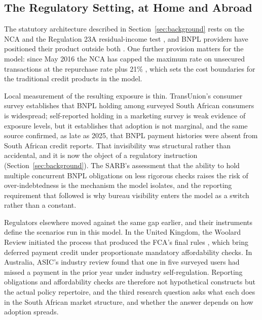 \subsection{The Regulatory Setting, at Home and Abroad}
\label{sec:lit-regulatory}

The statutory architecture described in Section~\ref{sec:background} rests on the \ac{NCA}
\cite{sa_nca_2005} and the Regulation 23A residual-income test \cite{sa_ncr_affordability_2015},
and \ac{BNPL} providers have positioned their product outside both \cite{nortonrose_bnpl_sa}. One
further provision matters for the model: since May 2016 the \ac{NCA} has capped the maximum rate
on unsecured transactions at the repurchase rate plus 21\% \cite{sa_ncr_ratecaps_2016}, which
sets the cost boundaries for the traditional credit products in the model.

Local measurement of the resulting exposure is thin. TransUnion's consumer survey
\cite{transunion_cps_sa_2025} establishes that \ac{BNPL} holding among surveyed South African
consumers is widespread; self-reported holding in a marketing survey is weak evidence of exposure
levels, but it establishes that adoption is not marginal, and the same source confirmed, as late as
2025, that \ac{BNPL} payment histories were absent from South African credit reports. That
invisibility was structural rather than accidental, and it is now the object of a regulatory
instruction (Section~\ref{sec:background}). The \ac{SARB}'s assessment that the ability to hold
multiple concurrent \ac{BNPL} obligations on less rigorous checks raises the risk of
over-indebtedness \cite{sarb_fsr_2026_1} is the mechanism the model isolates, and the reporting
requirement that followed is why bureau visibility enters the model as a switch rather than a
constant.

Regulators elsewhere moved against the same gap earlier, and their instruments define the
scenarios run in this model. In the United Kingdom, the Woolard Review \cite{woolard2021}
initiated the process that produced the \ac{FCA}'s final rules \cite{fca_ps26_1}, which bring
deferred payment credit under proportionate mandatory affordability checks. In Australia,
\ac{ASIC}'s industry review \cite{asic2020rep672} found that one in five surveyed users had missed
a payment in the prior year under industry self-regulation. Reporting obligations and
affordability checks are therefore not hypothetical constructs but the actual policy repertoire,
and the third research question asks what each does in the South African market structure, and
whether the answer depends on how adoption spreads.

